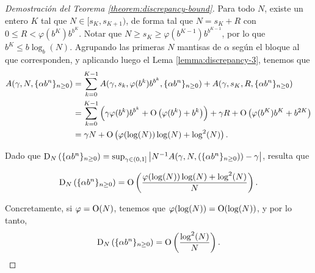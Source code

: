 \begin{proof}[Demostración del Teorema \ref{theorem:discrepancy-bound}]

Para todo $N$, existe un entero $K$ tal que $N \in [s_K, s_{K+1})$, de forma
tal que $N = s_K + R$ con $0 \leq R < \varphi(b^K)b^{b^K}$.
Notar que $N \geq s_K \geq \varphi(b^{K-1})b^{b^{K-1}}$, por lo que
$b^K \leq b \log_b(N)$.
Agrupando las primeras
$N$ mantisas de $\alpha$ según el bloque al que corresponden,
y aplicando luego el Lema \ref{lemma:discrepancy-3}, tenemos que
\begin{align*}
A(\gamma, N, \lbrace \alpha b^n \rbrace_{n \geq 0})
	&= \sum_{k=0}^{K - 1} A(\gamma, s_k, \varphi(b^k)b^{b^k},
		\lbrace \alpha b^n \rbrace_{n \geq 0})
		+ A(\gamma, s_K, R, \lbrace \alpha b^n \rbrace_{n \geq 0}) \\
	&= \sum_{k=0}^{K - 1} \left( \gamma \varphi(b^k)b^{b^k} +
		\operatorname{O} \left( \varphi(b^k) + b^{k} \right) \right)
		+ \gamma R + \operatorname{O} \left(\varphi(b^K)b^{K} + b^{2K} \right) \\
	&= \gamma N + \operatorname{O} \left(\varphi(\log(N))\log(N) + \log^2(N) \right).
\end{align*}

Dado que $\operatorname{D}_{N}\left(\lbrace \alpha b^n \rbrace_{n \geq 0}\right)
= \sup_{\gamma \in (0,1]} \left\vert N^{-1} A(\gamma, N,
\left(\lbrace \alpha b^n \rbrace_{n \geq 0}\right)) - \gamma \right\vert$, resulta que

\[ \operatorname{D}_{N}\left(\lbrace \alpha b^n \rbrace_{n \geq 0}\right) =
	\operatorname{O} \left(\frac{\varphi(\log(N)) \log(N) + \log^2(N)}{N} \right). \]

Concretamente, si $\varphi = \operatorname{O}(N)$, tenemos que $\varphi(\log(N))
= \operatorname{O}(\log(N))$, y por lo tanto,
\[ \operatorname{D}_{N}\left(\lbrace \alpha b^n \rbrace_{n \geq 0}\right)
	= \operatorname{O} \left( \frac{\log^2(N)}{N} \right). \qedhere \]
\end{proof}
